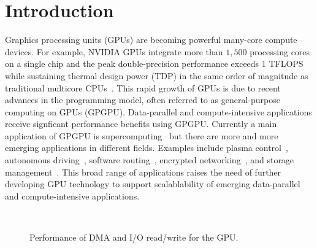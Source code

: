 \section{Introduction}
\label{sec:introduction}

Graphics processing units (GPUs) are becoming powerful many-core compute
devices.
For example, NVIDIA GPUs integrate more than $1,500$ processing cores on
a single chip and the peak double-precision performance exceeds 1
TFLOPS while sustaining thermal design power (TDP) in the same order of
magnitude as traditional multicore CPUs~\cite{NVIDIA_Kepler}. 
This rapid growth of GPUs is due to recent advances in the
programming model, often referred to as general-purpose computing on
GPUs (GPGPU).
Data-parallel and compute-intensive applications receive signficant
performance benefits using GPGPU.
Currently a main application of GPGPU is supercomputing~\cite{TOP500}
but there are more and more emerging applications in different fields.
Examples include plasma control~\cite{Kato_ICCPS13}, autonomous
driving~\cite{McNaughton_ICRA11}, software routing~\cite{Han_SIGCOMM10},
encrypted networking~\cite{Jang_NSDI11}, and storage
management~\cite{Bhatotia_FAST12, Gharaibeh_HPDC10, Kato_ATC12,
Sun_SYSTOR12}.
This broad range of applications raises the need of further developing
GPU technology to support scalablability of emerging data-parallel and
compute-intensive applications.

\begin{figure}[!t]
 \centering
 \\
 \caption{Performance of DMA and I/O read/write for the GPU.}
 \label{fig:intro_data_transfer}
\end{figure}


